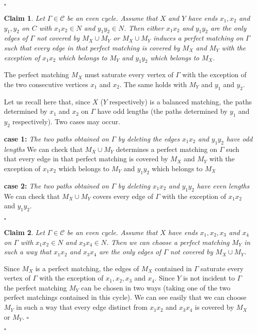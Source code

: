 \documentclass{amsart}
\newtheorem{Clm}{Claim}[thm]
\theoremstyle{definition}
\theoremstyle{remark}
\newenvironment{prf}{{\bf \noindent Proof } }{\hfill$\square$\\}
\newenvironment{PrfClaim}{{\bf Proof }}{{\hfill\tiny{$\square$\\}}}
\begin{document}
\begin{prf}
\begin{PrfClaim}
\end{PrfClaim}

\begin{Clm}\label{Claim:EvenCyclesSecond}
Let $\Gamma \in \mathcal C$ be an even cycle. Assume that $X$ and
$Y$ have ends $x_{1},x_{2}$ and $y_{1},y_{2}$ on $C$ with
$x_{1}x_{2} \in N$ and $y_{1}y_{2} \in N$. Then either $x_{1}x_{2}$
and $y_{1}y_{2}$ are the only edges of $\Gamma$ not covered by
$M_{X} \cup M_{Y}$ or $M_{X} \cup M_{Y}$ induces a perfect matching
on $\Gamma$ such that every edge in that perfect matching is covered
by $M_{X}$ and $M_{Y}$ with the exception of $x_{1}x_{2}$ which
belongs to $M_{Y}$ and $y_{1}y_{2}$ which belongs to $M_{X}$.
\end{Clm}
\begin{PrfClaim}The perfect matching $M_{X}$ must saturate every vertex of
$\Gamma$ with the
exception of the two consecutive vertices $x_{1}$ and $x_{2}$. The
same holds with $M_{Y}$ and $y_{1}$ and $y_{2}$.


Let us recall here that, since  $X$ ($Y$ respectively) is a balanced
matching, the paths determined by $x_{1}$ and $x_{2}$ on $\Gamma$
have odd lengths (the paths determined by $y_{1}$ and $y_{2}$
respectively). Two cases may occur.

{\bf case 1:} {\it The two paths obtained on $\Gamma$ by deleting
the edges $x_{1}x_{2}$ and $y_{1}y_{2}$  have odd lengths} We can
check that $M_{X} \cup M_{Y}$ determines a perfect matching on
$\Gamma$ such that every edge in that perfect matching is covered by
$M_{X}$ and $M_{Y}$ with the exception of $x_{1}x_{2}$ which belongs
to $M_{Y}$ and $y_{1}y_{2}$ which belongs to $M_{X}$



{\bf case 2:} {\it The two paths obtained on $\Gamma$ by deleting
$x_{1}x_{2}$ and $y_{1}y_{2}$  have even lengths} We can check that
$M_{X} \cup M_{Y}$ covers every edge of $\Gamma$ with the exception
of $x_{1}x_{2}$ and $y_{1}y_{2}$.

\end{PrfClaim}


\begin{Clm}\label{Claim:EvenCyclesThird}
Let $\Gamma \in \mathcal C$ be an even cycle. Assume that $X$ have
ends $x_{1},x_{2},x_{3}$ and $x_{4}$ on $\Gamma$ with $x_{1}x_{2}
\in N$ and $x_{3}x_{4} \in N$.  Then we can choose a perfect
matching $M_{Y}$ in such a way that $x_{1}x_{2}$ and $x_{3}x_{4}$
are the only edges of $\Gamma$ not covered by $M_{X} \cup M_{Y}$.
\end{Clm}
\begin{PrfClaim}
Since $M_{X}$ is a perfect matching, the edges of $M_{X}$  contained
in $\Gamma$ saturate every vertex of $\Gamma$ with the exception of
$x_{1},x_{2},x_{3}$ and $x_{4}$. Since  $Y$ is not incident to
$\Gamma$ the perfect matching $M_{Y}$ can be chosen in two ways
(taking one of the two perfect matchings contained in this cycle).
We can see easily that we can choose $M_{Y}$ in such a way that
every edge distinct from $x_{1}x_{2}$ and $x_{3}x_{4}$ is covered by
$M_{X}$ or $M_{Y}$.
\end{PrfClaim}


\end{prf}
\end{document}
